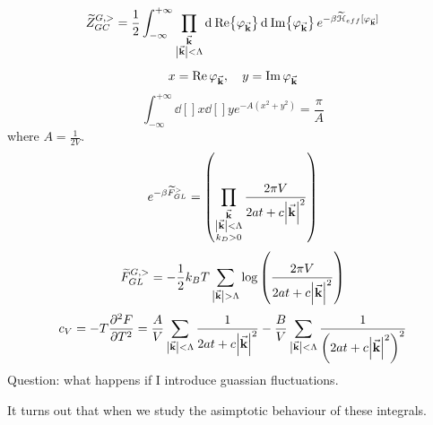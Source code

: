 \documentclass[../main/main.tex]{subfiles}
\begin{document}
\begin{equation}
  \widetilde{Z}_{GC}^{G,>} = \frac{1}{2} \int_{- \infty }^{+ \infty } \prod_{\substack{ \va{k}   \\\abs{\va{k}} < \Lambda } }^{} \dd[]{\Re {\varphi _{\va{k}}}}  \dd[]{\Im {\varphi _{\va{k}}}}
  e^{- \beta \widetilde{\mathcal{H}}_{eff} [\varphi _{\va{k}}] }
\end{equation}
\begin{equation}
  x = \Re \varphi _{\va{k}}, \quad   y = \Im \varphi _{\va{k}}
\end{equation}
\begin{equation}
  \int_{-\infty }^{+\infty } \dd[]{x} \dd[]{y} e^{-A (x^2+y^2)} = \frac{\pi }{A}
\end{equation}
where \( A= \frac{1}{2V} \).
\begin{equation}
  e^{-\beta \widetilde{F}_{GL}^> } = \qty(\prod_{\substack{\va{k} \\ \abs{\va{k}} <\Lambda \\ k_D > 0  } }^{}  \frac{2 \pi V}{2 a t + c \abs{\va{k}}^2 } )
\end{equation}
\begin{equation}
  \widetilde{F}_{GL}^{G,>} = - \frac{1}{2} k_B T \sum_{\abs{\va{k}}> \Lambda  }^{}
  \log{\qty(\frac{2 \pi V}{2 a t + c \abs{\va{k}}^2 })}
\end{equation}
\begin{equation}
  c_V = - T \pdv[2]{F}{T} = \frac{A}{V} \sum_{\abs{\va{k}} < \Lambda  }^{}
  \frac{1}{2 a t + c \abs{\va{k}}^2 } - \frac{B}{V} \sum_{\abs{\va{k}}< \Lambda  }^{} \frac{1}{\qty(2 a t + c \abs{\va{k}}^2)^2 }
\end{equation}
Question: what happens if I introduce guassian fluctuations.

It turns out that when we study the asimptotic behaviour of these integrals.
\end{document}
